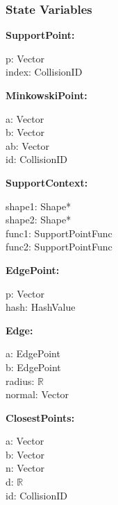 \documentclass[12pt]{article}
\newcommand{\R}{$\mathbb{R}$}
\begin{document}
\subsubsection{State Variables} \label{SecSVCollision}
\textbf{SupportPoint:} 
\begin{multicols}{2}
	\noindent p: Vector \\
	index: CollisionID
\end{multicols}
	
\noindent \textbf{MinkowskiPoint:} 
\begin{multicols}{2}
	\noindent a: Vector \\
	b: Vector \\
	ab: Vector \\
	id: CollisionID
\end{multicols}

\noindent \textbf{SupportContext:} 
\begin{multicols}{2}
	\noindent shape1: Shape* \\
	shape2: Shape* \\
	func1: SupportPointFunc \\
	func2: SupportPointFunc
\end{multicols}

\noindent \textbf{EdgePoint:} 
\begin{multicols}{2}
	\noindent p: Vector \\
	hash: HashValue
\end{multicols}

\noindent \textbf{Edge:} 
\begin{multicols}{2}
	\noindent a: EdgePoint \\
	b: EdgePoint \\
	radius: \R \\
	normal: Vector
\end{multicols}

\pagebreak %

\noindent \textbf{ClosestPoints:} 
\begin{multicols}{3}
	\noindent a: Vector \\
	b: Vector \\
	n: Vector \\
	d: \R \\
	id: CollisionID
\end{multicols}

\end{document}
